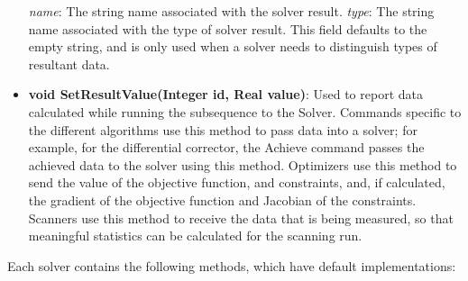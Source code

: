 \begin{itemize}
\subitem \textit{name}: The string name associated with the solver result.
\subitem \textit{type}: The string name associated with the type of solver result.  This field
defaults to the empty string, and is only used when a solver needs to distinguish types of resultant
data.
\item \textbf{void SetResultValue(Integer id, Real value)}:  Used to report data
calculated while running the subsequence to the Solver.  Commands specific to the different
algorithms use this method to pass data into a solver; for example, for the differential corrector,
the Achieve command passes the achieved data to the solver using this method.  Optimizers use this
method to send the value of the objective function, and constraints, and, if calculated, the
gradient of the objective function and Jacobian of the constraints.  Scanners use this method to
receive the data that is being measured, so that meaningful statistics can be calculated for the
scanning run.
\end{itemize}

\noindent Each solver contains the following methods, which have default implementations:

